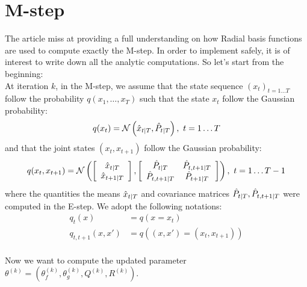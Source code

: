 \section{M-step}

The article miss at providing a full understanding on how Radial basis functions are used to compute exactly the M-step. In order to implement safely, it is of interest to write down all the analytic computations. So let's start from the beginning:\\

At iteration $k$, in the M-step, we assume that the state sequence $(x_t)_{t=1 \ldots T}$ follow the probability $q \left(x_1, \ldots ,x_T \right)$ such that the state $x_t$ follow the Gaussian probability:
\begin{align*}
  q(x_t) = \mathcal{N}\left( \hat{x}_{t \mathbin{\vert} T}, \hat{P}_{t \mathbin{\vert} T} \right), \  t=1 \ldots T\\
\end{align*}
and that the joint states $(x_t, x_{t+1})$ follow the Gaussian probability:
\begin{align*}
  q(x_t, x_{t+1}) &=
  \mathcal{N}
    \left(
      \left[
        \begin{array}{c} \hat{x}_{t \mathbin{\vert} T} \\ \hat{x}_{t+1 \mathbin{\vert} T} \end{array}
      \right],
      \left[
        \begin{array}{cc} \hat{P}_{t \mathbin{\vert} T} & \hat{P}_{t,t+1 \mathbin{\vert} T}\\ \hat{P}_{t,t+1 \mathbin{\vert} T} & \hat{P}_{t+1 \mathbin{\vert} T} \end{array}
      \right]
    \right), \  t=1 \ldots T-1\\
\end{align*}
where the quantities the means $\hat{x}_{t \mathbin{\vert} T}$ and covariance matrices $\hat{P}_{t \mathbin{\vert} T}, \hat{P}_{t,t+1 \mathbin{\vert} T}$ were computed in the E-step.
We adopt the following notations:
\begin{align*}
  q_t(x) &= q(x = x_t)\\
  q_{t,t+1}(x,x') &= q \left((x,x') = (x_t, x_{t+1})\right)\\
\end{align*}

Now we want to compute the updated parameter $\theta^{(k)} = \left( \theta_f^{(k)}, \theta_g^{(k)}, Q^{(k)}, R^{(k)} \right)$.

